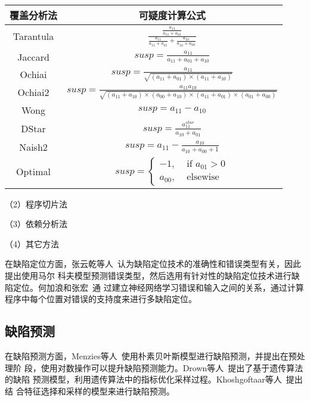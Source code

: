 \begin{center}
\label{fig:susp}
\begin{tabular}{|c|c|}
\hline
覆盖分析法 & 可疑度计算公式 \\ \hline
Tarantula & $\frac{\frac{a_{11}}{a_{11}+a_{01}}}{\frac{a_{11}}{a_{11}+a_{01}}+\frac{a_{10}}{a_{10}+a_{00}}}$\\ 
Jaccard & $susp = \frac{a_{11}}{a_{11}+a_{01}+a_{10}}$\\ 
Ochiai & $susp = \frac{a_{11}}{\sqrt{(a_{11}+a_{01})\times(a_{11}+a_{10})}}$\\
Ochiai2 & $susp = \frac{a_{11}a_{10}}{\sqrt{(a_{11}+a_{10})\times (a_{00}+a_{10})\times (a_{11}+a_{01})\times (a_{01}+a_{00})}}$\\ 
Wong & $susp = a_{11}-a_{10}$\\
DStar & $susp = \frac{a_{11}^{star}}{a_{10}+a_{01}}$\\ 
Naish2 & $susp = a_{11}-\frac{a_{10}}{a_{10}+a_{00}+1}$ \\
Optimal & $susp = \begin{cases}
  -1, & \text{ if } a_{01}>0 \\ 
  a_{00}, & \text{ elsewise }  
  \end{cases}$\\ \hline
\end{tabular}
\end{center}





（2）程序切片法


（3）依赖分析法

（4）其它方法

在缺陷定位方面，张云乾等人~\cite{malcov2013}认为缺陷定位技术的准确性和错误类型有关，因此提出使用马尔
科夫模型预测错误类型，然后选用有针对性的缺陷定位技术进行缺陷定位。何加浪和张宏~\cite{nnfault2013}通
过建立神经网络学习错误和输入之间的关系，通过计算程序中每个位置对错误的支持度来进行多缺陷定位。

\subsection{缺陷预测}

在缺陷预测方面，Menzies等人~\cite{menzies2007data}使用朴素贝叶斯模型进行缺陷预测，并提出在预处理阶
段，使用对数操作可以提升缺陷预测能力。Drown等人~\cite{drown2009evolutionary}提出了基于遗传算法的缺陷
预测模型，利用遗传算法中的指标优化采样过程。Khoshgoftaar等人~\cite{khoshgoftaar2010attribute}提出结
合特征选择和采样的模型来进行缺陷预测。
